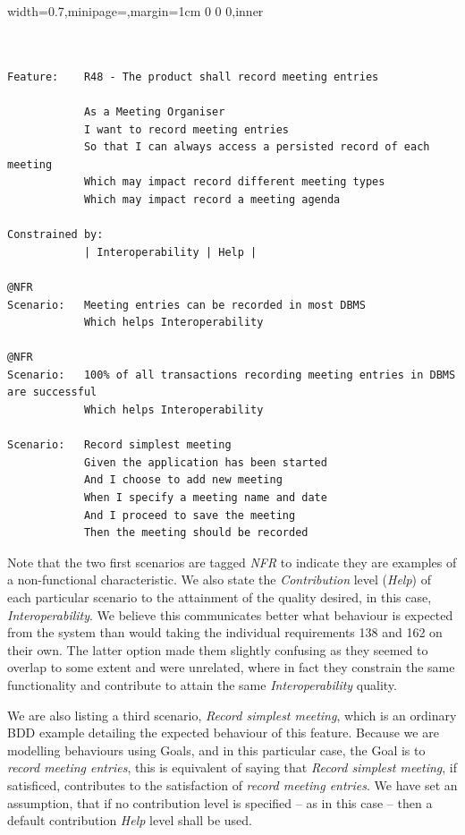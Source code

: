 \documentclass[dissertation,final]{softeng}
\newenvironment{featurecode}[1]
{ \lrbox\featurebox \begin{adjustbox}{width=#1\textwidth,minipage=\textwidth,margin=1cm 0 0 0,inner} }
{ \end{adjustbox}\endlrbox}
\newenvironment{featurelist}[2]
{
\newcommand{\setcaption}{\caption{#1}}
\newcommand{\setlabel}{\label{#2}}
}
{\begin{listing}[h!]\centering\usebox\featurebox\setcaption\setlabel\end{listing}}
\begin{document}
\begin{featurelist}{Changes to Gherkin -- Scenarios}{lst:gherkin_changes_scenarios}
\begin{featurecode}{0.7}
\begin{verbatim}


Feature:    R48 - The product shall record meeting entries

            As a Meeting Organiser
            I want to record meeting entries
            So that I can always access a persisted record of each meeting
            Which may impact record different meeting types
            Which may impact record a meeting agenda
	
Constrained by:
            | Interoperability | Help |

@NFR
Scenario:   Meeting entries can be recorded in most DBMS
            Which helps Interoperability

@NFR	
Scenario:   100% of all transactions recording meeting entries in DBMS are successful
            Which helps Interoperability

Scenario:   Record simplest meeting
            Given the application has been started
            And I choose to add new meeting
            When I specify a meeting name and date
            And I proceed to save the meeting
            Then the meeting should be recorded
\end{verbatim}
\end{featurecode}
\end{featurelist}

Note that the two first scenarios are tagged \emph{NFR} to indicate they are examples of a non-functional characteristic. We also state the \emph{Contribution} level (\emph{Help}) of each particular scenario to the attainment of the quality desired, in this case, \emph{Interoperability}. We believe this communicates better what behaviour is expected from the system than would taking the individual requirements 138 and 162 on their own. The latter option made them slightly confusing as they seemed to overlap to some extent and were unrelated, where in fact they constrain the same functionality and contribute to attain the same \emph{Interoperability} quality.

We are also listing a third scenario, \emph{Record simplest meeting}, which is an ordinary BDD example detailing the expected behaviour of this feature. Because we are modelling behaviours using Goals, and in this particular case, the Goal is to \emph{record meeting entries}, this is equivalent of saying that \emph{Record simplest meeting}, if satisficed, contributes to the satisfaction of \emph{record meeting entries}. We have set an assumption, that if no contribution level is specified -- as in this case -- then a default contribution \emph{Help} level shall be used.
\end{document}
